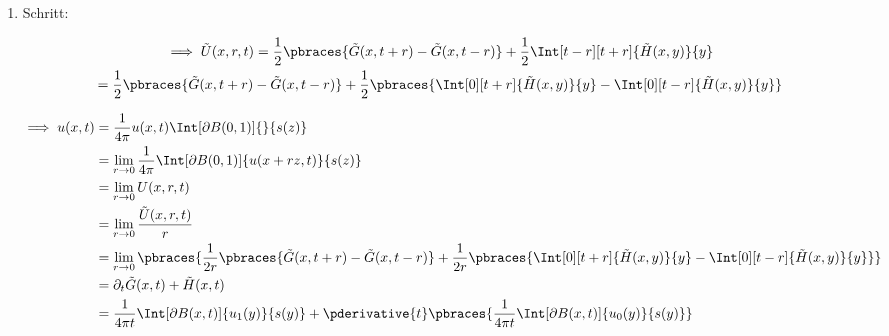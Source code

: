 \begin{solution}
\begin{enumerate}[label = \arabic*.]
\begin{enumerate}[label = 2.\arabic*.]
    \end{enumerate}

    \item Schritt:


    \begin{multline*}
        \implies
        \tilde U(x, r, t)
        =
        \frac{1}{2}
        \pbraces
        {
            \tilde G(x, t + r)
            -
            \tilde G(x, t - r)
        }
        +
        \frac{1}{2}
        \Int[t-r][t+r]{\tilde H(x, y)}{y} \\
        =
        \frac{1}{2}
        \pbraces
        {
            \tilde G(x, t + r)
            -
            \tilde G(x, t - r)
        }
        +
        \frac{1}{2}
        \pbraces
        {
            \Int[0][t+r]{\tilde H(x, y)}{y}
            -
            \Int[0][t-r]{\tilde H(x, y)}{y}
        }
    \end{multline*}

    \begin{align*}
        \implies
        u(x, t)
        & =
        \frac{1}{4 \pi}
        u(x, t)
        \Int[\partial B(0, 1)]{}{s(z)} \\
        & =
        \lim_{r \to 0}
        \frac{1}{4 \pi}
        \Int[\partial B(0, 1)]{u(x + r z, t)}{s(z)} \\
        & =
        \lim_{r \to 0}
        U(x, r, t) \\
        & =
        \lim_{r \to 0}
        \frac{\tilde U(x, r, t)}{r} \\
        & =
        \lim_{r \to 0}
        \pbraces
        {
            \frac{1}{2 r}
            \pbraces
            {
                \tilde G(x, t + r)
                -
                \tilde G(x, t - r)
            }
            +
            \frac{1}{2 r}
            \pbraces
            {
                \Int[0][t+r]{\tilde H(x, y)}{y}
                -
                \Int[0][t-r]{\tilde H(x, y)}{y}
            }
        } \\
        & =
        \partial_t \tilde G(x, t) + \tilde H(x, t) \\
        & =
        \frac{1}{4 \pi t}
        \Int[\partial B(x, t)]{u_1(y)}{s(y)}
        +
        \pderivative{t}
        \pbraces
        {
            \frac{1}{4 \pi t}
            \Int[\partial B(x, t)]{u_0(y)}{s(y)}
        }
    \end{align*}

\end{enumerate}

\end{solution}

